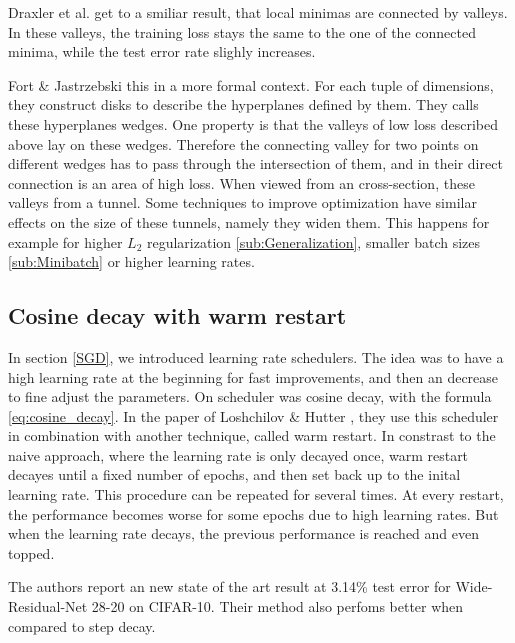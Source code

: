 Draxler et al. \cite{draxler2018essentially} get to a smiliar result, that local
minimas are connected by valleys. In these valleys, the training loss stays the
same to the one of the connected minima, while the test error rate slighly
increases.

Fort \& Jastrzebski \cite{fort2019large}  this in a more formal context. For
each tuple of dimensions, they construct disks to describe the hyperplanes
defined by them. They calls these hyperplanes wedges. One property is that the
valleys of low loss described above lay on these wedges. Therefore the
connecting valley for two points on different wedges has to pass through the
intersection of them, and in their direct connection is an area of high loss.
When viewed from an cross-section, these valleys from a tunnel. Some techniques
to improve optimization have similar effects on the size of these tunnels,
namely they widen them. This happens for example for higher $L_2$ regularization
\ref{sub:Generalization}, smaller batch sizes \ref{sub:Minibatch} or higher
learning rates.


\subsection{Cosine decay with warm restart}\label{sub:cosine_decay}

In section \ref{SGD}, we introduced learning rate schedulers. The idea was to
have a high learning rate at the beginning for fast improvements, and then an
decrease to fine adjust the parameters. On scheduler was cosine decay, with the
formula \ref{eq:cosine_decay}. In the paper of Loshchilov \& Hutter
\cite{loshchilov2016sgdr}, they use this scheduler in combination with another
technique, called warm restart. In constrast to the naive approach, where the
learning rate is only decayed once, warm restart decayes until a fixed number of
epochs, and then set back up to the inital learning rate. This procedure can be
repeated for several times. At every restart, the performance becomes worse for
some epochs due to high learning rates. But when the learning rate decays, the
previous performance is reached and even topped.

The authors report an new state of the art result at 3.14\% test error for
Wide-Residual-Net 28-20 on CIFAR-10. Their method also perfoms better when
compared to step decay. 


